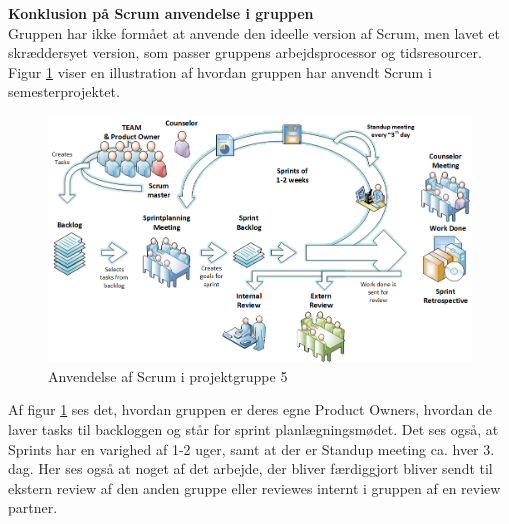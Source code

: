 \documentclass[a4paper,12pt,fleqn,oneside]{article}
\begin{document}
\textbf{Konklusion på Scrum anvendelse i gruppen }\\
Gruppen har ikke formået at anvende den ideelle version af Scrum, men lavet et skræddersyet version, som passer gruppens arbejdsprocessor og tidsresourcer. Figur \ref{fig:scrum_usage} viser en illustration af hvordan gruppen har anvendt Scrum i semesterprojektet. 
\begin{figure}[H]
    \centering
    \includegraphics[width=\textwidth]{ProcesDokument/graphics/Scrum_usage.png}
    \caption{Anvendelse af Scrum i projektgruppe 5}
    \label{fig:scrum_usage}
\end{figure}
Af figur \ref{fig:scrum_usage} ses det, hvordan gruppen er deres egne Product Owners, hvordan de laver tasks til backloggen og står for sprint planlægningsmødet. Det ses også, at Sprints har en varighed af 1-2 uger, samt at der er Standup meeting ca. hver 3. dag. Her ses også at noget af det arbejde, der bliver færdiggjort bliver sendt til ekstern review af den anden gruppe eller reviewes internt i gruppen af en review partner. 
\end{document}

